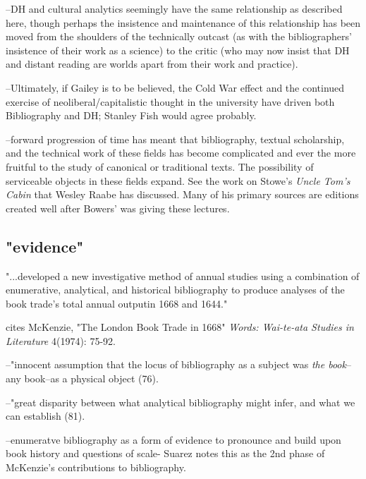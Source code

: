 \documentclass[course, english]{Notes}
\newcommand{\n}{\scalebox{2}{\textbf{\framebox{$\aleph$} } } }
\begin{document}
\n --DH and cultural analytics seemingly have the same relationship as described here, though perhaps the insistence and maintenance of this relationship has been moved from the shoulders of the technically outcast (as with the bibliographers' insistence of their work as a science) to the critic (who may now insist that DH and distant reading are worlds apart from their work and practice).
	
\n --Ultimately, if Gailey is to be believed, the Cold War effect and the continued exercise of neoliberal/capitalistic thought in the university have driven both Bibliography and DH; Stanley Fish would agree probably.
	
\n --forward progression of time has meant that bibliography, textual scholarship, and the technical work of these fields has become complicated and ever the more fruitful to the study of canonical or traditional texts. The possibility of serviceable objects in these fields expand. See the work on Stowe's \emph{Uncle Tom's Cabin} that Wesley Raabe has discussed. Many of his primary sources are editions created well after Bowers' was giving these lectures.


\subsection{"evidence"}

"...developed a new investigative method of annual studies using a combination of enumerative, analytical, and historical bibliography to produce analyses of the book trade's total annual outputin 1668 and 1644."

cites McKenzie, "The London Book Trade in 1668" \emph{Words: Wai-te-ata Studies in Literature} 4(1974): 75-92.
	\begin{displayquote}
	--"innocent assumption that the locus of bibliography as a subject was \emph{the book}--any book--as a physical object (76). 
	
	--"great disparity between what analytical bibliography might infer, and what we can establish (81). 
	\end{displayquote}

\n --enumeratve bibliography as a form of evidence to pronounce and build upon book history and questions of scale- Suarez notes this as the 2nd phase of McKenzie's contributions to bibliography.
\end{document}
